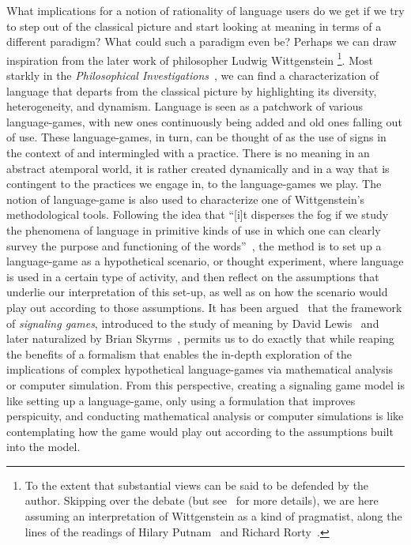 \documentclass[a4paper]{article}
\begin{document}
What implications for a notion of rationality of language users do we get if we try to step out of the classical picture and start looking at meaning in terms of a different paradigm?
What could such a paradigm even be?
Perhaps we can draw inspiration from the later work of philosopher Ludwig Wittgenstein%
\footnote{To the extent that substantial views can be said to be defended by the author. Skipping over the debate (but see~\cite{kahane_wittgenstein_2007} for more details), we are here assuming an interpretation of Wittgenstein as a kind of pragmatist, along the lines of the readings of Hilary Putnam~\parencite*{putnam_pragmatism_1994} and Richard Rorty~\parencite*{rorty_wittgenstein_2007}.}.
Most starkly in the \emph{Philosophical Investigations}~\parencite*{wittgenstein_philosophical_1953}, we can find a characterization of language that departs from the classical picture by highlighting its diversity, heterogeneity, and dynamism.
Language is seen as a patchwork of various language-games, with new ones continuously being added and old ones falling out of use.
These language-games, in turn, can be thought of as the use of signs in the context of and intermingled with a practice.
There is no meaning in an abstract atemporal world, it is rather created dynamically and in a way that is contingent to the practices we engage in, to the language-games we play.
The notion of language-game is also used to characterize one of Wittgenstein's methodological tools.
Following the idea that ``[i]t disperses the fog if we study the phenomena of language in primitive kinds of use in which one can clearly survey the purpose and functioning of the words''~\parencite*[\S 5]{wittgenstein_philosophical_1953}, the method is to set up a language-game as a hypothetical scenario, or thought experiment, where language is used in a certain type of activity, and then reflect on the assumptions that underlie our interpretation of this set-up, as well as on how the scenario would play out according to those assumptions.
It has been argued~\parencite{correia_bivalent_2013} that the framework of \emph{signaling games}, introduced to the study of meaning by David Lewis~\parencite*{lewis_convention_1969} and later naturalized by Brian Skyrms~\parencite*{skyrms_evolution_1996,skyrms_signals_2010}, permits us to do exactly that while reaping the benefits of a formalism that enables the in-depth exploration of the implications of complex hypothetical language-games via mathematical analysis or computer simulation.
From this perspective, creating a signaling game model is like setting up a language-game, only using a formulation that improves perspicuity, and conducting mathematical analysis or computer simulations is like contemplating how the game would play out according to the assumptions built into the model.
\end{document}
